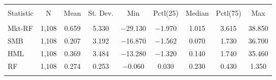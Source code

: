 
\begin{tabular}{@{\extracolsep{5pt}}lcccccccc} 
\\[-1.8ex]\hline 
\hline \\[-1.8ex] 
Statistic & \multicolumn{1}{c}{N} & \multicolumn{1}{c}{Mean} & \multicolumn{1}{c}{St. Dev.} & \multicolumn{1}{c}{Min} & \multicolumn{1}{c}{Pctl(25)} & \multicolumn{1}{c}{Median} & \multicolumn{1}{c}{Pctl(75)} & \multicolumn{1}{c}{Max} \\ 
\hline \\[-1.8ex] 
Mkt-RF & 1,108 & 0.659 & 5.330 & $-$29.130 & $-$1.970 & 1.015 & 3.615 & 38.850 \\ 
SMB & 1,108 & 0.207 & 3.192 & $-$16.870 & $-$1.562 & 0.070 & 1.730 & 36.700 \\ 
HML & 1,108 & 0.369 & 3.484 & $-$13.280 & $-$1.320 & 0.140 & 1.740 & 35.460 \\ 
RF & 1,108 & 0.274 & 0.253 & $-$0.060 & 0.030 & 0.230 & 0.430 & 1.350 \\ 
\hline \\[-1.8ex] 
\end{tabular} 
